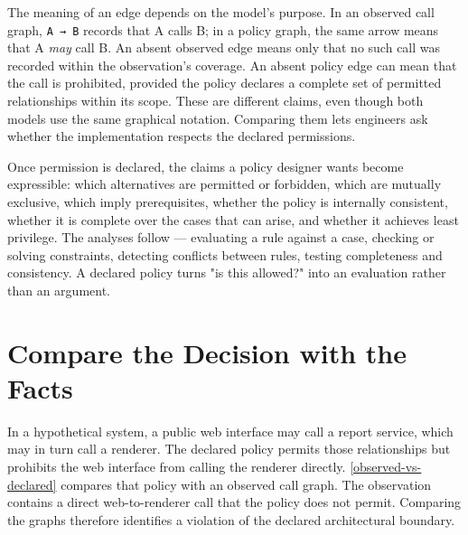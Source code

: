 
The meaning of an edge depends on the model's purpose. In an observed call graph, \texttt{A~→~B} records that A calls B; in a policy graph, the same arrow means that A \emph{may} call B. An absent observed edge means only that no such call was recorded within the observation's coverage. An absent policy edge can mean that the call is prohibited, provided the policy declares a complete set of permitted relationships within its scope. These are different claims, even though both models use the same graphical notation. Comparing them lets engineers ask whether the implementation respects the declared permissions.


Once permission is declared, the claims a policy designer wants become expressible: which alternatives are permitted or forbidden, which are mutually exclusive, which imply prerequisites, whether the policy is internally consistent, whether it is complete over the cases that can arise, and whether it achieves least privilege. The analyses follow --- evaluating a rule against a case, checking or solving constraints, detecting conflicts between rules, testing completeness and consistency. A declared policy turns "is this allowed?" into an evaluation rather than an argument.

\section{Compare the Decision with the Facts}\label{heading:compare-the-decision-with-the-facts}


In a hypothetical system, a public web interface may call a report service, which may in turn call a renderer. The declared policy permits those relationships but prohibits the web interface from calling the renderer directly. \autoref{observed-vs-declared} compares that policy with an observed call graph. The observation contains a direct web-to-renderer call that the policy does not permit. Comparing the graphs therefore identifies a violation of the declared architectural boundary.

